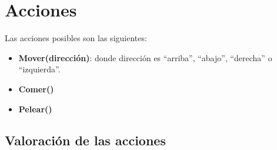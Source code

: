 \section{Acciones}

Las acciones posibles son las siguientes:

\begin{itemize}

\item \textbf{Mover(dirección)}: donde dirección es ``arriba'', ``abajo'',
``derecha'' o ``izquierda''.

\item \textbf{Comer()}

\item \textbf{Pelear()}

\end{itemize}

\subsection{Valoración de las acciones}

